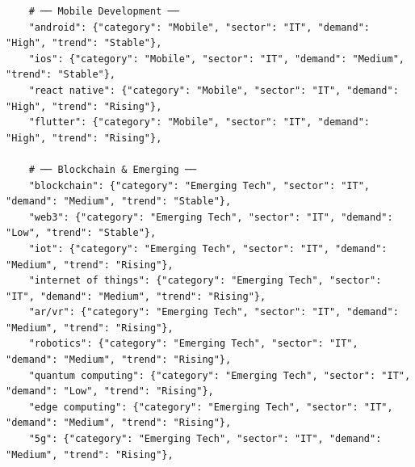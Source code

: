 \documentclass[12pt,a4paper]{report}
\begin{document}
\begin{verbatim}
    # ── Mobile Development ──
    "android": {"category": "Mobile", "sector": "IT", "demand": "High", "trend": "Stable"},
    "ios": {"category": "Mobile", "sector": "IT", "demand": "Medium", "trend": "Stable"},
    "react native": {"category": "Mobile", "sector": "IT", "demand": "High", "trend": "Rising"},
    "flutter": {"category": "Mobile", "sector": "IT", "demand": "High", "trend": "Rising"},

    # ── Blockchain & Emerging ──
    "blockchain": {"category": "Emerging Tech", "sector": "IT", "demand": "Medium", "trend": "Stable"},
    "web3": {"category": "Emerging Tech", "sector": "IT", "demand": "Low", "trend": "Stable"},
    "iot": {"category": "Emerging Tech", "sector": "IT", "demand": "Medium", "trend": "Rising"},
    "internet of things": {"category": "Emerging Tech", "sector": "IT", "demand": "Medium", "trend": "Rising"},
    "ar/vr": {"category": "Emerging Tech", "sector": "IT", "demand": "Medium", "trend": "Rising"},
    "robotics": {"category": "Emerging Tech", "sector": "IT", "demand": "Medium", "trend": "Rising"},
    "quantum computing": {"category": "Emerging Tech", "sector": "IT", "demand": "Low", "trend": "Rising"},
    "edge computing": {"category": "Emerging Tech", "sector": "IT", "demand": "Medium", "trend": "Rising"},
    "5g": {"category": "Emerging Tech", "sector": "IT", "demand": "Medium", "trend": "Rising"},


\end{verbatim}
\end{document}
